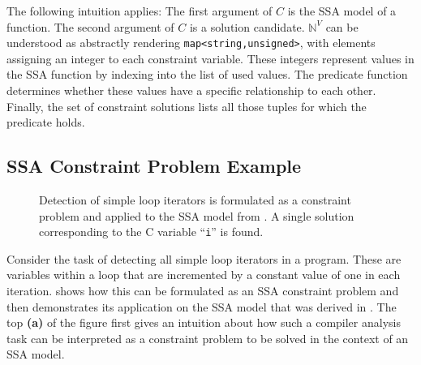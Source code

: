     The following intuition applies:
    The first argument of $C$ is the SSA model of a function.
    The second argument of $C$ is a solution candidate.
    $\mathbb N^V$ can be understood as abstractly rendering
    \lstinline[language=MyCpp]{map<string,unsigned>}, with elements assigning
    an integer to each constraint variable.
    These integers represent values in the SSA function by indexing into the
    list of used values.
    The predicate function determines whether these values have a specific
    relationship to each other.
    Finally, the set of constraint solutions lists all those tuples for which
    the predicate holds.

\subsection{SSA Constraint Problem Example}

\begin{figure}[p]
    
\caption{Detection of simple loop iterators is formulated as a constraint
         problem and applied to the SSA model from .
         A single solution corresponding to the C variable ``{\tt i}'' is found.}
\label{fig:constraintsolution}
\end{figure}

    Consider the task of detecting all simple loop iterators in a program.
    These are variables within a loop that are incremented by a constant value
    of one in each iteration.
     shows how this can be formulated as an
    SSA constraint problem and then demonstrates its application on the
    SSA model that was derived in .
    The top {\bf(a)} of the figure first gives an intuition about how such a
    compiler analysis task can be interpreted as a constraint problem to be
    solved in the context of an SSA model.

